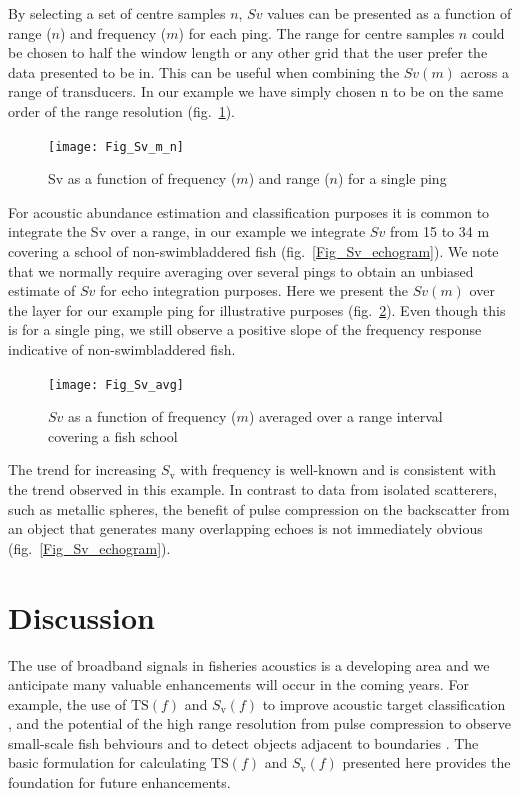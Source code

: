 \documentclass[preprint,12pt,TurnOnLineNumbers]{JASAnew}
\newcommand{\freqsym}{f}
\newcommand{\ts}{\textrm{TS}}
\newcommand{\sv}{S_{\textrm{v}}}
\begin{document}
By selecting a set of centre samples $n$, $Sv$ values can be presented as a function of range ($n$) and frequency ($m$) for each ping. The range for centre samples $n$ could be chosen to half the window length or any other grid that the user prefer the data presented to be in. This can be useful when combining the $Sv(m)$ across a range of transducers. In our example we have simply chosen n to be on the same order of the range resolution (fig.~\ref{Fig_Sv_m_n}).

\begin{figure}
\texttt{[image: Fig\_Sv\_m\_n]}
\caption{\label{Fig_Sv_m_n} Sv as a function of frequency ($m$) and range ($n$) for a single ping}
\end{figure}

For acoustic abundance estimation and classification purposes it is common to integrate the Sv over a range, in our example we integrate $Sv$ from 15 to 34 m covering a school of non-swimbladdered fish (fig.~\ref{Fig_Sv_echogram}). We note that we normally require averaging over several pings to obtain an unbiased estimate of $Sv$ for echo integration purposes. Here we present the $Sv(m)$ over the layer for our example ping for illustrative purposes (fig.~\ref{Fig_Sv_avg}). Even though this is for a single ping, we still observe a positive slope of the frequency response indicative of non-swimbladdered fish. 

\begin{figure}
\texttt{[image: Fig\_Sv\_avg]}
\caption{\label{Fig_Sv_avg} $Sv$ as a function of frequency ($m$) averaged over a range interval covering a fish school }
\end{figure}

The trend for increasing $\sv$ with frequency is well-known \citep{korneliussen2010} and is consistent with the trend observed in this example. In contrast to data from isolated scatterers, such as metallic spheres, the benefit of pulse compression on the backscatter from an object that generates many overlapping echoes is not immediately obvious (fig.~\ref{Fig_Sv_echogram}).

\section{Discussion}
The use of broadband signals in fisheries acoustics is a developing area and we anticipate many valuable enhancements will occur in the coming years. For example, the use of $\ts(\freqsym)$ and $\sv(\freqsym)$ to improve acoustic target classification \citep{bassett_broadband_2018, korneliussen2018}, and the potential of the high range resolution from pulse compression to observe small-scale fish behviours \citep{skaret2020} and to detect objects adjacent to boundaries \citep{lavery2017}. The basic formulation for calculating $\ts(\freqsym)$ and $\sv(\freqsym)$ presented here provides the foundation for future enhancements.
\end{document}

